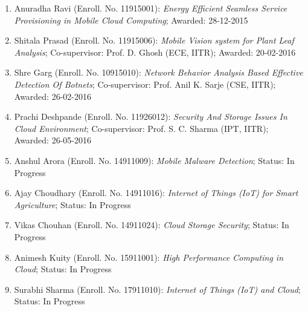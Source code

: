 \begin{enumerate}[label=(PHD\arabic*).]	
		\item Anuradha Ravi (Enroll. No. 11915001): \textit{Energy Efficient Seamless Service Provisioning in Mobile Cloud Computing}; Awarded: 28-12-2015
		\item Shitala Prasad (Enroll. No. 11915006): \textit{Mobile Vision system for Plant Leaf Analysis}; Co-supervisor: Prof. D. Ghosh (ECE, IITR); Awarded: 20-02-2016
		\item Shre Garg (Enroll. No. 10915010): \textit{Network Behavior Analysis Based Effective Detection Of Botnets}; Co-supervisor: Prof. Anil K. Sarje (CSE, IITR); Awarded: 26-02-2016
		\item Prachi Deshpande (Enroll. No. 11926012): \textit{Security And Storage Issues In Cloud Environment}; Co-supervisor: Prof. S. C. Sharma (IPT, IITR); Awarded: 26-05-2016
					\item Anshul Arora (Enroll. No. 14911009): \textit{Mobile Malware Detection}; Status: In Progress
			\item Ajay Choudhary (Enroll. No. 14911016): \textit{Internet of Things (IoT) for Smart Agriculture}; Status: In Progress
			\item Vikas Chouhan (Enroll. No. 14911024): \textit{Cloud Storage Security}; Status: In Progress
			\item Animesh Kuity (Enroll. No. 15911001): \textit{High Performance Computing in Cloud};	Status: In Progress	 	
			\item Surabhi Sharma (Enroll. No. 17911010): \textit{Internet of Things (IoT) and Cloud}; Status: In Progress	
			\end{enumerate}
